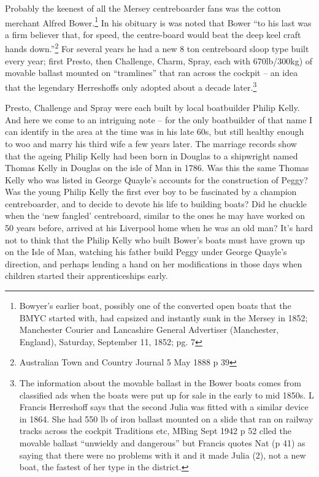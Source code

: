\documentclass[
  letterpaper,
]{scrbook}
\begin{document}
Probably the keenest of all the Mersey centreboarder fans was the cotton
merchant Alfred Bower.\footnote{Bowyer's earlier boat, possibly one of
  the converted open boats that the BMYC started with, had capsized and
  instantly sunk in the Mersey in 1852; Manchester Courier and
  Lancashire General Advertiser (Manchester, England), Saturday,
  September 11, 1852; pg. 7} In his obituary is was noted that Bower
``to his last was a firm believer that, for speed, the centre-board
would beat the deep keel craft hands down.''\footnote{Australian Town
  and Country Journal 5 May 1888 p 39} For several years he had a new 8
ton centreboard sloop type built every year; first Presto, then
Challenge, Charm, Spray, each with 670lb/300kg) of movable ballast
mounted on ``tramlines'' that ran across the cockpit -- an idea that the
legendary Herreshoffs only adopted about a decade later.\footnote{The
  information about the movable ballast in the Bower boats comes from
  classified ads when the boats were put up for sale in the early to mid
  1850s. L Francis Herreshoff says that the second Julia was fitted with
  a similar device in 1864. She had 550 lb of iron ballast mounted on a
  slide that ran on railway tracks across the cockpit Traditions etc,
  MBing Sept 1942 p 52 clled the movable ballast ``unwieldy and
  dangerous'' but Francis quotes Nat (p 41) as saying that there were no
  problems with it and it made Julia (2), not a new boat, the fastest of
  her type in the district.}

Presto, Challenge and Spray were each built by local boatbuilder Philip
Kelly. And here we come to an intriguing note -- for the only
boatbuilder of that name I can identify in the area at the time was in
his late 60s, but still healthy enough to woo and marry his third wife a
few years later. The marriage records show that the ageing Philip Kelly
had been born in Douglas to a shipwright named Thomas Kelly in Douglas
on the isle of Man in 1786. Was this the same Thomas Kelly who was
listed in George Quayle's accounts for the construction of Peggy? Was
the young Philip Kelly the first ever boy to be fascinated by a champion
centreboarder, and to decide to devote his life to building boats? Did
he chuckle when the `new fangled' centreboard, similar to the ones he
may have worked on 50 years before, arrived at his Liverpool home when
he was an old man? It's hard not to think that the Philip Kelly who
built Bower's boats must have grown up on the Isle of Man, watching his
father build Peggy under George Quayle's direction, and perhaps lending
a hand on her modifications in those days when children started their
apprenticeships early.
\end{document}
